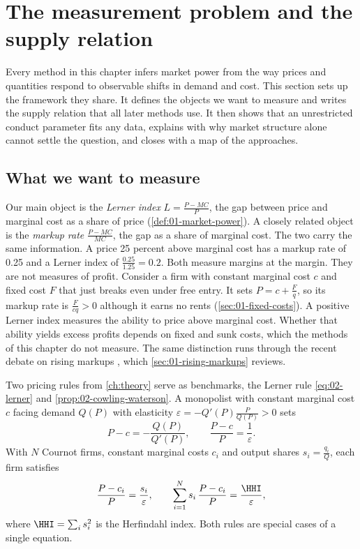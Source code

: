 \section{The measurement problem and the supply relation}\label{sec:03-framework}

Every method in this chapter infers market power from the way prices and quantities respond to observable shifts in
demand and cost. This section sets up the framework they share. It defines the objects we want to measure and writes
the supply relation that all later methods use. It then shows that an unrestricted conduct parameter fits any data,
explains with \citet{Stigler1964} why market structure alone cannot settle the question, and closes with a map of the
approaches.

\subsection{What we want to measure}\label{sec:03-objects}

Our main object is the \emph{Lerner index} $L = \frac{P - MC}{P}$, the gap between price and marginal cost as a share
of price (\cref{def:01-market-power}). A closely related object is the \emph{markup rate} $\frac{P - MC}{MC}$, the gap
as a share of marginal cost. The two carry the same information. A price 25 percent above marginal cost has a markup
rate of 0.25 and a Lerner index of $\frac{0.25}{1.25} = 0.2$. Both measure margins at the margin. They are not
measures of profit. Consider a firm with constant marginal cost $c$ and fixed cost $F$ that just breaks even under free
entry. It sets $P = c + \frac{F}{q}$, so its markup rate is $\frac{F}{cq} > 0$ although it earns no rents
(\cref{sec:01-fixed-costs}). A positive Lerner index measures the ability to price above marginal cost. Whether that
ability yields excess profits depends on fixed and sunk costs, which the methods of this chapter do not measure. The
same distinction runs through the recent debate on rising markups \citep{DeLoeckerEeckhoutUnger2020}, which
\cref{sec:01-rising-markups} reviews.

Two pricing rules from \cref{ch:theory} serve as benchmarks, the Lerner rule \eqref{eq:02-lerner} and
\cref{prop:02-cowling-waterson}. A monopolist with constant marginal cost $c$ facing demand $Q(P)$ with elasticity
$\varepsilon = -Q'(P)\frac{P}{Q(P)} > 0$ sets
\begin{equation*}
P - c = -\frac{Q(P)}{Q'(P)}, \qquad \frac{P - c}{P} = \frac{1}{\varepsilon}.
\end{equation*}
With $N$ Cournot firms, constant marginal costs $c_i$ and output shares $s_i = \frac{q_i}{Q}$, each firm satisfies
\begin{equation*}
\frac{P - c_i}{P} = \frac{s_i}{\varepsilon}, \qquad \sum_{i=1}^{N} s_i\,\frac{P - c_i}{P} = \frac{\HHI}{\varepsilon},
\end{equation*}
where $\HHI = \sum_i s_i^2$ is the Herfindahl index. Both rules are special cases of a single equation.


